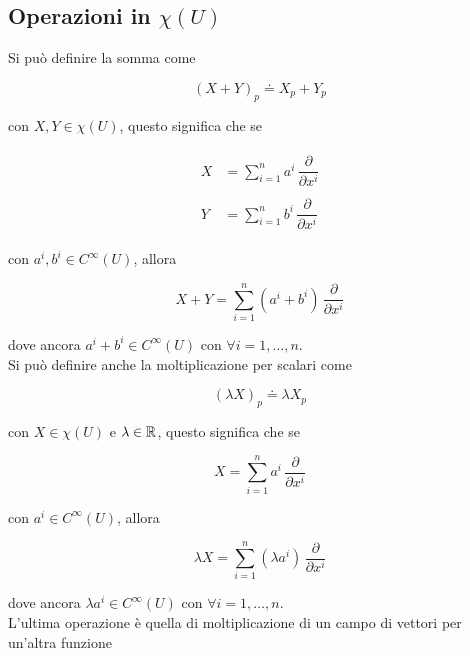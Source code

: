 \subsection{Operazioni in $ \chi(U) $}

Si può definire la somma come

\begin{equation}
	(X+Y)_{p} \doteq X_{p} + Y_{p}
\end{equation}

con $ X,Y \in \chi(U) $, questo significa che se

\begin{align}
	\begin{split}
		X &= \sum_{i=1}^{n} a^{i} \, \dfrac{\partial}{\partial x^{i}}\\\\
		Y &= \sum_{i=1}^{n} b^{i} \, \dfrac{\partial}{\partial x^{i}}
	\end{split}
\end{align}

con $ a^{i},b^{i} \in C^{\infty}(U) $, allora

\begin{equation}
	X+Y = \sum_{i=1}^{n} (a^{i}+b^{i}) \, \dfrac{\partial}{\partial x^{i}}
\end{equation}

dove ancora $ a^{i}+b^{i} \in C^{\infty}(U) $ con $ \forall i=1,\dots,n $.\\
Si può definire anche la moltiplicazione per scalari come

\begin{equation}
	(\lambda X)_{p} \doteq \lambda X_{p}
\end{equation}

con $ X \in \chi(U) $ e $ \lambda \in \mathbb{R} $, questo significa che se

\begin{equation}
	X = \sum_{i=1}^{n} a^{i} \, \dfrac{\partial}{\partial x^{i}}
\end{equation}

con $ a^{i} \in C^{\infty}(U) $, allora

\begin{equation}
	\lambda X = \sum_{i=1}^{n} (\lambda a^{i}) \, \dfrac{\partial}{\partial x^{i}}
\end{equation}

dove ancora $ \lambda a^{i} \in C^{\infty}(U) $ con $ \forall i=1,\dots,n $.\\
L'ultima operazione è quella di moltiplicazione di un campo di vettori per un'altra funzione

